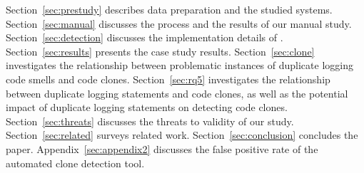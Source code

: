 Section~\ref{sec:prestudy} describes data preparation %
and the studied systems. Section~\ref{sec:manual} discusses the process and the results of our manual study. %
Section~\ref{sec:detection} discusses the implementation details of \tool. Section~\ref{sec:results} presents the case study results. 
Section~\ref{sec:clone} investigates the relationship between problematic instances of duplicate logging code smells and code clones. Section~\ref{sec:rq5} investigates the relationship between duplicate logging statements and code clones, as well as the potential impact of duplicate logging statements on detecting code clones. Section~\ref{sec:threats} discusses the threats to validity of our study. Section~\ref{sec:related} surveys related work. Section~\ref{sec:conclusion} concludes the paper. %
Appendix~\ref{sec:appendix2} discusses the false positive rate of the automated clone detection tool. 


